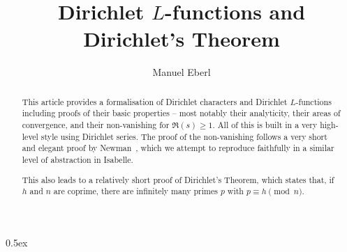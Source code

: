 \documentclass[11pt,a4paper]{article}
\begin{document}
\title{Dirichlet $L$-functions and Dirichlet's Theorem}
\author{Manuel Eberl}
\maketitle

\begin{abstract}
This article provides a formalisation of Dirichlet characters and Dirichlet $L$-functions including proofs of their basic properties -- most notably their analyticity, their areas of convergence, and their non-vanishing for $\mathfrak{R}(s)\geq 1$. All of this is built in a very high-level style using Dirichlet series. The proof of the non-vanishing follows a very short and elegant proof by Newman~\cite{newman1998analytic}, which we attempt to reproduce faithfully in a similar level of abstraction in Isabelle.

This also leads to a relatively short proof of Dirichlet's Theorem, which states that, if $h$ and $n$ are coprime, there are infinitely many primes $p$ with $p \equiv h \pmod{n}$.
\end{abstract}

\newpage
\tableofcontents
\newpage
\parindent 0pt\parskip 0.5ex





\end{document}
